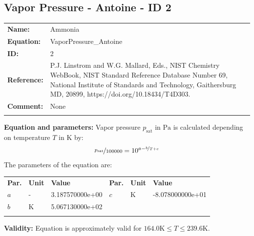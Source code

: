 \FloatBarrier
\newpage
\subsection{Vapor Pressure - Antoine - ID 2}
%
\begin{tabular}[l]{|lp{11.5cm}|}
\hline
\addlinespace

\textbf{Name:} & Ammonia \\
\textbf{Equation:} & VaporPressure\_Antoine \\
\textbf{ID:} & 2 \\
\textbf{Reference:} & P.J. Linstrom and W.G. Mallard, Eds., NIST Chemistry WebBook, NIST Standard Reference Database Number 69, National Institute of Standards and Technology, Gaithersburg MD, 20899, https://doi.org/10.18434/T4D303. \\
\textbf{Comment:} & None \\

\addlinespace
\hline
\end{tabular}
\newline

\textbf{Equation and parameters:}
\newline
%
Vapor pressure $p_\mathrm{sat}$ in $\si{\pascal}$ is calculated depending on temperature $T$ in $\si{\kelvin}$ by:
%
\begin{equation*}
\nicefrac{p_\mathrm{sat}}{100000} = 10^{a - \nicefrac{b}{T + c}}
\end{equation*}
%
The parameters of the equation are:
%
\begin{longtable}[l]{lll|lll}
\toprule
\addlinespace
\textbf{Par.} & \textbf{Unit} & \textbf{Value} &	\textbf{Par.} & \textbf{Unit} & \textbf{Value} \\
\addlinespace
\midrule
\endhead

\bottomrule
\endfoot
\bottomrule
\endlastfoot
\addlinespace

$a$ & - & 3.187570000e+00 & $c$ & $\si{\kelvin}$  & -8.078000000e+01 \\
$b$ & $\si{\kelvin}$ & 5.067130000e+02 & & & \\

\addlinespace\end{longtable}

\textbf{Validity:}
\newline
Equation is approximately valid for $164.0 \si{\kelvin} \leq T \leq 239.6 \si{\kelvin}$.
\newline

